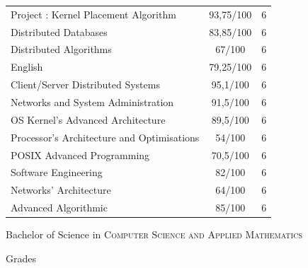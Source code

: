 \begin{center}
\begin{tabular}{lcc}
\hline
Project : Kernel Placement Algorithm                       & 93,75/100 & 6     \\
Distributed Databases                                      & 83,85/100 & 6     \\
Distributed Algorithms                                     &    67/100 & 6     \\
English                                                    & 79,25/100 & 6     \\
Client/Server Distributed Systems                          &  95,1/100 & 6     \\
Networks and System Administration                         &  91,5/100 & 6 \\
\hline
OS Kernel's Advanced Architecture                          &  89,5/100 & 6     \\
Processor's Architecture and Optimisations                 &    54/100 & 6     \\
POSIX Advanced Programming                                 &  70,5/100 & 6     \\
Software Engineering                                       &    82/100 & 6     \\
Networks' Architecture	                                   &    64/100 & 6     \\
Advanced Algorithmic                                       &    85/100 & 6 \\
\hline
\end{tabular}
\end{center}
\bigskip
\bigskip


\newpage

\par{\centering\Large \hypertarget{grds_bs}{Bachelor of Science in \textsc{Computer Science and Applied Mathematics}}\par}\large{\centering Grades\par}\normalsize

